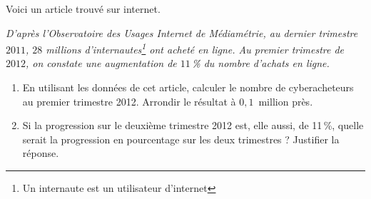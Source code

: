 
\medskip

Voici un article trouvé sur internet.
 
\emph{D'après l'Observatoire des Usages Internet de Médiamétrie, au dernier trimestre $2011$, $28$ millions d'internautes\footnote{Un internaute est un utilisateur d'internet}  ont acheté en ligne. Au premier trimestre de $2012$, on constate une augmentation de $11$\,\% du nombre d'achats en ligne.}

\medskip 

\begin{enumerate}
\item En utilisant les données de cet article, calculer le nombre de cyberacheteurs au premier trimestre 2012. Arrondir le résultat à $0,1$~million près. 
\item Si la progression sur le deuxième trimestre 2012 est, elle aussi, de 11\,\%, quelle serait la progression en pourcentage sur les deux trimestres ? Justifier la réponse.
\end{enumerate}
 
\bigskip

